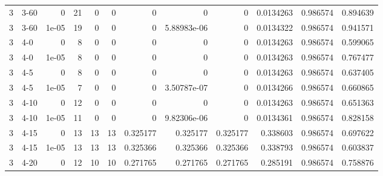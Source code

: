 \begin{tabular}{rlrrrrrrrrrr}
     3 & 3-60   &      0     &          21 &                 0 &                 0 &     0           &     0           &      0           &        0.0134263 &               0.986574 &           0.894639 \\
     3 & 3-60   &      1e-05 &          19 &                 0 &                 0 &     0           &     5.88983e-06 &      0           &        0.0134322 &               0.986574 &           0.941571 \\
     3 & 4-0    &      0     &           8 &                 0 &                 0 &     0           &     0           &      0           &        0.0134263 &               0.986574 &           0.599065 \\
     3 & 4-0    &      1e-05 &           8 &                 0 &                 0 &     0           &     0           &      0           &        0.0134263 &               0.986574 &           0.767477 \\
     3 & 4-5    &      0     &           8 &                 0 &                 0 &     0           &     0           &      0           &        0.0134263 &               0.986574 &           0.637405 \\
     3 & 4-5    &      1e-05 &           7 &                 0 &                 0 &     0           &     3.50787e-07 &      0           &        0.0134266 &               0.986574 &           0.660865 \\
     3 & 4-10   &      0     &          12 &                 0 &                 0 &     0           &     0           &      0           &        0.0134263 &               0.986574 &           0.651363 \\
     3 & 4-10   &      1e-05 &          11 &                 0 &                 0 &     0           &     9.82306e-06 &      0           &        0.0134361 &               0.986574 &           0.828158 \\
     3 & 4-15   &      0     &          13 &                13 &                13 &     0.325177    &     0.325177    &      0.325177    &        0.338603  &               0.986574 &           0.697622 \\
     3 & 4-15   &      1e-05 &          13 &                13 &                13 &     0.325366    &     0.325366    &      0.325366    &        0.338793  &               0.986574 &           0.603837 \\
     3 & 4-20   &      0     &          12 &                10 &                10 &     0.271765    &     0.271765    &      0.271765    &        0.285191  &               0.986574 &           0.758876 \\

\end{tabular}
